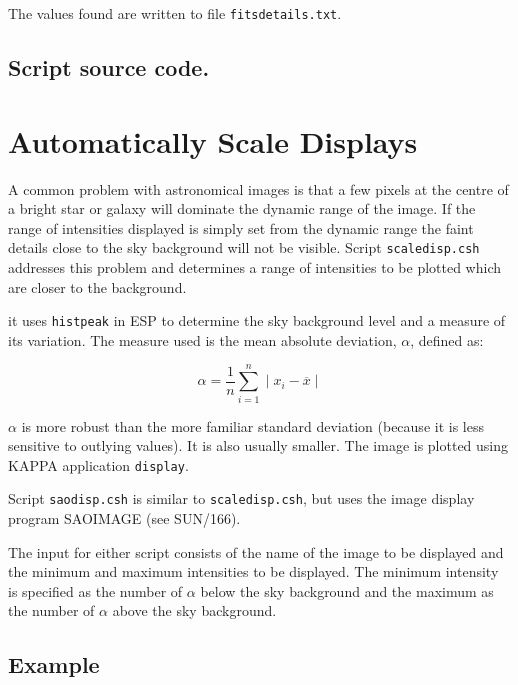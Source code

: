 \documentclass[twoside,11pt]{article}
\newcommand{\htmladdnormallink}[2]{#1}
\newcommand{\xref}[3]{#1}
\newcommand{\xlabel}[1]{}
\begin{document}
The values found are written to file {\tt fitsdetails.txt}.

\begin{htmlonly}
\subsection*{\htmladdnormallink{Script source code.}{fitsinfo.lis}}
\end{htmlonly}


\newpage
\section{\xlabel{SCALEDISP}\label{SCALEDISP}Automatically Scale Displays}

A common problem with astronomical images is that  a few pixels at the
centre of a bright star or galaxy will dominate the dynamic range of
the image.  If the range of intensities displayed is simply set from
the dynamic range the faint details close to the sky background will not
be visible.  Script {\tt scaledisp.csh} addresses this problem and
determines a range of intensities to be plotted which are closer to the
background.

it uses \xref{{\tt histpeak}}{sun180}{SESSION1} in \xref{ESP}{sun180}{}
to determine the sky background level and a measure of its variation.
The measure used is the mean absolute deviation, $\alpha$, defined as:

\begin{equation}
\alpha = \frac{1}{n} \sum_{i=1}^{n} \mid x_{i} - \overline{x} \mid
\end{equation}

$\alpha$ is more robust than the more familiar standard deviation
(because it is less sensitive to outlying values).  It is also usually
smaller.  The image is plotted using KAPPA application
\xref{{\tt display}}{sun95}{DISPLAY}.

Script {\tt saodisp.csh} is similar to {\tt scaledisp.csh}, but uses
the image display program SAOIMAGE (see
\xref{SUN/166}{sun166}{}\/\cite{SUN166}).

The input for either script consists of the name of the image to be
displayed and the minimum and maximum intensities to be displayed.  The
minimum intensity is specified as the number of $\alpha$ below the sky
background and the maximum as the number of $\alpha$ above the sky
background.

\subsection*{Example}
\end{document}
